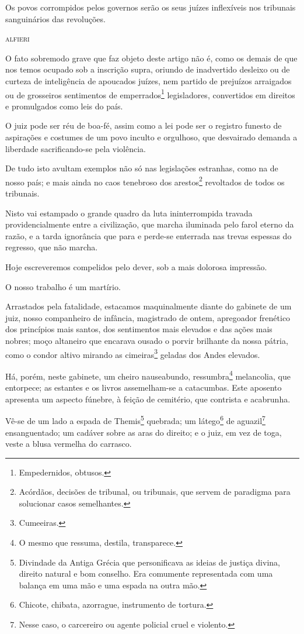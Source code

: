 


\epigraph{Os povos corrompidos pelos governos serão os seus juízes inflexíveis nos
tribunais sanguinários das revoluções.}{\textsc{alfieri}\footnotemark}


O fato sobremodo grave que faz objeto deste artigo não é, como os demais
de que nos temos ocupado sob a inscrição supra, oriundo de inadvertido
desleixo ou de curteza de inteligência de apoucados juízes, nem partido
de prejuízos arraigados ou de grosseiros sentimentos de
emperrados\footnote{Empedernidos, obtusos.} legisladores, convertidos
em direitos e promulgados como leis do país.

O juiz pode ser réu de boa-fé, assim como a lei pode ser o registro
funesto de aspirações e costumes de um povo inculto e orgulhoso, que
desvairado demanda a liberdade sacrificando-se pela violência.

De tudo isto avultam exemplos não só nas legislações estranhas, como na
de nosso país; e mais ainda no caos tenebroso dos arestos\footnote{
  Acórdãos, decisões de tribunal, ou tribunais, que servem de paradigma
  para solucionar casos semelhantes.} revoltados de todos os tribunais.

Nisto vai estampado o grande quadro da luta ininterrompida travada
providencialmente entre a civilização, que marcha iluminada pelo farol
eterno da razão, e a tarda ignorância que para e perde-se enterrada nas
trevas espessas do regresso, que não marcha.

Hoje escreveremos compelidos pelo dever, sob a mais dolorosa impressão.

O nosso trabalho é um martírio.

Arrastados pela fatalidade, estacamos maquinalmente diante do gabinete
de um juiz, nosso companheiro de infância, magistrado de ontem,
apregoador frenético dos princípios mais santos, dos sentimentos mais
elevados e das ações mais nobres; moço altaneiro que encarava ousado o
porvir brilhante da nossa pátria, como o condor altivo mirando as
cimeiras\footnote{Cumeeiras.} geladas dos Andes elevados.

Há, porém, neste gabinete, um cheiro nauseabundo, ressumbra\footnote{O
  mesmo que ressuma, destila, transparece.} melancolia, que entorpece;
as estantes e os livros assemelham-se a catacumbas. Este aposento
apresenta um aspecto fúnebre, à feição de cemitério, que contrista e
acabrunha.

Vê-se de um lado a espada de Themis\footnote{Divindade da Antiga\label{themis}
  Grécia que personificava as ideias de justiça divina, direito natural
  e bom conselho. Era comumente representada com uma balança em uma mão
  e uma espada na outra mão.} quebrada; um látego\footnote{Chicote,
  chibata, azorrague, instrumento de tortura.} de aguazil\footnote{
  Nesse caso, o carcereiro ou agente policial cruel e violento.}
ensanguentado; um cadáver sobre as aras do direito; e o juiz, em vez de
toga, veste a blusa vermelha do carrasco.

